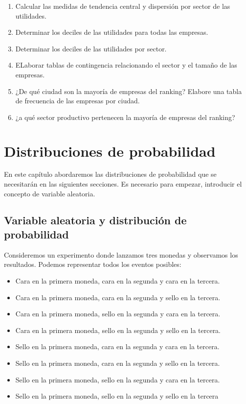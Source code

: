 \documentclass[
]{krantz}
\providecommand{\tightlist}{%
  \setlength{\itemsep}{0pt}\setlength{\parskip}{0pt}}
\begin{document}
\begin{enumerate}
\begin{enumerate}
    \begin{enumerate}
    \def\labelenumiii{\arabic{enumiii}.}
    \tightlist
    \item
      Calcular las medidas de tendencia central y dispersión por sector de las utilidades.
    \item
      Determinar los deciles de las utilidades para todas las empresas.
    \item
      Determinar los deciles de las utilidades por sector.
    \item
      ELaborar tablas de contingencia relacionando el sector y el tamaño de las empresas.
    \item
      ¿De qué ciudad son la mayoría de empresas del ranking? Elabore una tabla de frecuencia de las empresas por ciudad.
    \item
      ¿a qué sector productivo pertenecen la mayoría de empresas del ranking?
    \end{enumerate}
  \end{enumerate}
\end{enumerate}

\hypertarget{distr}{%
\chapter{Distribuciones de probabilidad}\label{distr}}

En este capítulo abordaremos las distribuciones de probabilidad que se necesitarán en las siguientes secciones. Es necesario para empezar, introducir el concepto de variable aleatoria.

\hypertarget{variable-aleatoria-y-distribucion-de-probabilidad}{%
\section{Variable aleatoria y distribución de probabilidad}\label{variable-aleatoria-y-distribucion-de-probabilidad}}

Consideremos un experimento donde lanzamos tres monedas y observamos los resultados. Podemos representar todos los eventos posibles:

\begin{itemize}
\tightlist
\item
  Cara en la primera moneda, cara en la segunda y cara en la tercera.
\item
  Cara en la primera moneda, cara en la segunda y sello en la tercera.
\item
  Cara en la primera moneda, sello en la segunda y cara en la tercera.
\item
  Cara en la primera moneda, sello en la segunda y sello en la tercera.
\item
  Sello en la primera moneda, cara en la segunda y cara en la tercera.
\item
  Sello en la primera moneda, cara en la segunda y sello en la tercera.
\item
  Sello en la primera moneda, sello en la segunda y cara en la tercera.
\item
  Sello en la primera moneda, sello en la segunda y sello en la tercera
\end{itemize}
\end{document}
